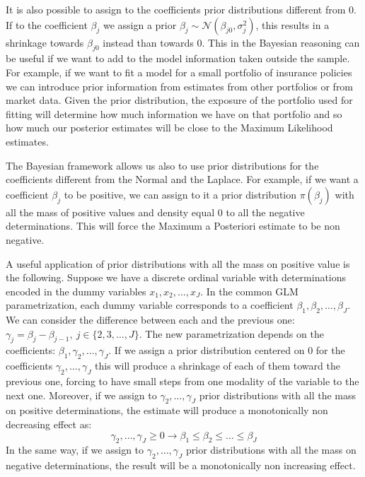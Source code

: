\documentclass[a4paper, nobind]{templates/ociamthesis}
\theoremstyle{definition}
\theoremstyle{definition}
\theoremstyle{definition}
\theoremstyle{remark}
\begin{document}
It is also possible to assign to the coefficients prior distributions different from \(0\). If to the coefficient \(\beta_j\) we assign a prior \(\beta_j\sim\mathcal{N}(\beta_{j0}, \sigma_j^2)\), this results in a shrinkage towards \(\beta_{j0}\) instead than towards \(0\). This in the Bayesian reasoning can be useful if we want to add to the model information taken outside the sample. For example, if we want to fit a model for a small portfolio of insurance policies we can introduce prior information from estimates from other portfolios or from market data. Given the prior distribution, the exposure of the portfolio used for fitting will determine how much information we have on that portfolio and so how much our posterior estimates will be close to the Maximum Likelihood estimates.

The Bayesian framework allows us also to use prior distributions for the coefficients different from the Normal and the Laplace. For example, if we want a coefficient \(\beta_j\) to be positive, we can assign to it a prior distribution \(\pi(\beta_j)\) with all the mass of positive values and density equal \(0\) to all the negative determinations. This will force the Maximum a Posteriori estimate to be non negative.

A useful application of prior distributions with all the mass on positive value is the following. Suppose we have a discrete ordinal variable with determinations encoded in the dummy variables \(x_1, x_2, \dots, x_J\). In the common GLM parametrization, each dummy variable corresponds to a coefficient \(\beta_1, \beta_2, \dots, \beta_J\). We can consider the difference between each and the previous one: \(\gamma_j = \beta_j - \beta_{j-1}, \ j\in\{2, 3, \dots, J\}\). The new parametrization depends on the coefficients: \(\beta_1, \gamma_2, \dots, \gamma_J\). If we assign a prior distribution centered on \(0\) for the coefficients \(\gamma_2, \dots, \gamma_J\) this will produce a shrinkage of each of them toward the previous one, forcing to have small steps from one modality of the variable to the next one. Moreover, if we assign to \(\gamma_2, \dots, \gamma_J\) prior distributions with all the mass on positive determinations, the estimate will produce a monotonically non decreasing effect as:
\[
\gamma_2, \dots, \gamma_J \ge 0 \longrightarrow \beta_1\le\beta_2\le\dots\le\beta_J
\]
In the same way, if we assign to \(\gamma_2, \dots, \gamma_J\) prior distributions with all the mass on negative determinations, the result will be a monotonically non increasing effect.
\end{document}
